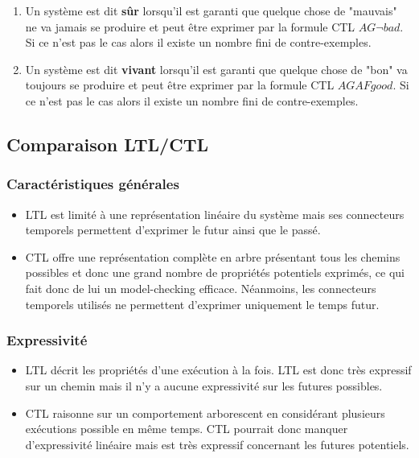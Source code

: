 \documentclass[runningheads,a4paper,10pt]{llncs}
\begin{document}
\begin{enumerate}
\item Un système est dit \textbf{sûr} lorsqu'il est garanti que quelque chose de "mauvais" ne va jamais se produire et peut être exprimer par la formule CTL $AG\neg bad$.  Si ce n'est pas le cas alors il existe un nombre fini de contre-exemples. 
\item Un système est dit \textbf{vivant} lorsqu'il est garanti que quelque chose de "bon" va toujours se produire et peut être exprimer par la formule CTL $AGAFgood$. Si ce n'est pas le cas alors il existe un nombre fini de contre-exemples. 
\end{enumerate}



\subsection{Comparaison LTL/CTL}

\subsubsection{Caractéristiques générales}
\begin{itemize}
\item LTL est limité à une représentation linéaire du système mais ses connecteurs temporels permettent d'exprimer le futur ainsi que le passé. 
\item CTL offre une représentation complète en arbre présentant tous les chemins possibles et donc une grand nombre de propriétés potentiels exprimés, ce qui fait donc de lui un model-checking efficace. Néanmoins, les connecteurs temporels utilisés ne permettent d'exprimer uniquement le temps futur. 
\end{itemize} 


\subsubsection{Expressivité}
\begin{itemize}
\item LTL décrit les propriétés d'une exécution à la fois. LTL est donc très expressif sur un chemin mais il n'y a aucune expressivité sur les futures possibles. 
\item CTL raisonne sur un comportement arborescent en considérant plusieurs exécutions possible en même temps. CTL pourrait donc manquer d'expressivité linéaire mais est très expressif concernant les futures potentiels. \\
\end{itemize}
\end{document}
